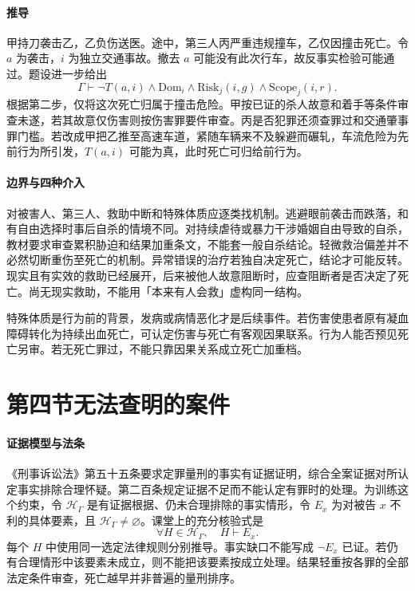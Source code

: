 \paragraph{推导}
甲持刀袭击乙，乙负伤送医。途中，第三人丙严重违规撞车，乙仅因撞击死亡。令 $a$ 为袭击，$i$ 为独立交通事故。撤去 $a$ 可能没有此次行车，故反事实检验可能通过。题设进一步给出
\[
\Gamma\vdash
  \neg T(a,i)\land\mathrm{Dom}_i
   \land\mathrm{Risk}_j(i,g)\land\mathrm{Scope}_j(i,r).
\]
根据第二步，仅将这次死亡归属于撞击危险。甲按已证的杀人故意和着手等条件审查未遂，若其故意仅伤害则按伤害罪要件审查。丙是否犯罪还须查罪过和交通肇事罪门槛。若改成甲把乙推至高速车道，紧随车辆来不及躲避而碾轧，车流危险为先前行为所引发，$T(a,i)$ 可能为真，此时死亡可归给前行为。

\paragraph{边界与四种介入}
对被害人、第三人、救助中断和特殊体质应逐类找机制。逃避眼前袭击而跌落，和有自由选择时事后自杀的情境不同。对持续虐待或暴力干涉婚姻自由导致的自杀，教材要求审查累积胁迫和结果加重条文，不能套一般自杀结论。轻微救治偏差并不必然切断重伤至死亡的机制。异常错误的治疗若独自决定死亡，结论才可能反转。现实且有实效的救助已经展开，后来被他人故意阻断时，应查阻断者是否决定了死亡。尚无现实救助，不能用「本来有人会救」虚构同一结构。

特殊体质是行为前的背景，发病或病情恶化才是后续事件。若伤害使患者原有凝血障碍转化为持续出血死亡，可认定伤害与死亡有客观因果联系。行为人能否预见死亡另审。若无死亡罪过，不能只靠因果关系成立死亡加重档。

\section{第四节\quad 无法查明的案件}

\paragraph{证据模型与法条}
《刑事诉讼法》第五十五条要求定罪量刑的事实有证据证明，综合全案证据对所认定事实排除合理怀疑。第二百条规定证据不足而不能认定有罪时的处理。为训练这个约束，令 $\mathcal H_\Gamma$ 是有证据根据、仍未合理排除的事实情形，令 $E_x$ 为对被告 $x$ 不利的具体要素，且 $\mathcal H_\Gamma\ne\varnothing$。课堂上的充分核验式是
\[
\forall H\in\mathcal H_\Gamma,\quad H\vdash E_x.
\]
每个 $H$ 中使用同一选定法律规则分别推导。事实缺口不能写成 $\neg E_x$ 已证。若仍有合理情形中该要素未成立，则不能把该要素按成立处理。结果轻重按各罪的全部法定条件审查，死亡越早并非普遍的量刑排序。

